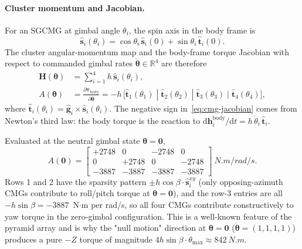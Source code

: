 \documentclass[conference]{IEEEtran}
\begin{document}
\paragraph{Cluster momentum and Jacobian.}  For an SGCMG at gimbal
angle $\theta_i$, the spin axis in the body frame is
\begin{equation}
  \hat{\bm s}_i(\theta_i) = \cos\theta_i\,\hat{\bm s}_i(0)
    + \sin\theta_i\,\hat{\bm t}_i(0).
\end{equation}
The cluster angular-momentum map and the body-frame torque Jacobian
with respect to commanded gimbal rates $\dot{\bm\theta}\in\mathbb{R}^4$
are therefore
\begin{align}
  \bm H(\bm\theta) &= \sum_{i=1}^{4} h\,\hat{\bm s}_i(\theta_i), \label{eq:cmg-momentum}\\
  A(\bm\theta) &= \frac{\partial \bm\tau_\text{body}}{\partial \dot{\bm\theta}}
                 = -h\,\bigl[\hat{\bm t}_1(\theta_1)\;|\;\hat{\bm t}_2(\theta_2)\;|\;
                             \hat{\bm t}_3(\theta_3)\;|\;\hat{\bm t}_4(\theta_4)\bigr], \label{eq:cmg-jacobian}
\end{align}
where $\hat{\bm t}_i(\theta_i) = \hat{\bm g}_i \times \hat{\bm s}_i(\theta_i)$.
The negative sign in~\eqref{eq:cmg-jacobian} comes from Newton's third
law: the body torque is the reaction to
$\mathrm{d}\bm h_i^\text{body}/\mathrm{d}t
= h\,\dot\theta_i\,\hat{\bm t}_i$.

Evaluated at the neutral gimbal state $\bm\theta = \bm 0$,
\begin{equation}
  A(\bm 0) = \begin{bmatrix}
      +2748 &  0      & -2748 &  0 \\
      0     & +2748   & 0     & -2748 \\
      -3887 & -3887   & -3887 & -3887
  \end{bmatrix}\ \si{N.m \per rad \per s}.
  \label{eq:A0}
\end{equation}
Rows 1 and 2 have the sparsity pattern
$\pm h\cos\beta\cdot\hat{\bm s}_i^{xy}$ (only opposing-azimuth CMGs
contribute to roll/pitch torque at $\bm\theta = \bm 0$), and the
row-3 entries are all $-h\sin\beta = -3887$~N$\cdot$m per rad/s, so all
four CMGs contribute constructively to yaw torque in the zero-gimbal
configuration.  This is a well-known feature of the pyramid array and
is why the "null motion" direction at $\bm\theta = \bm 0$
($\dot{\bm\theta} = (1,1,1,1)$) produces a pure $-Z$ torque of
magnitude $4h\sin\beta\cdot\dot\theta_{\max} \approx \SI{842}{N.m}$.
\end{document}
